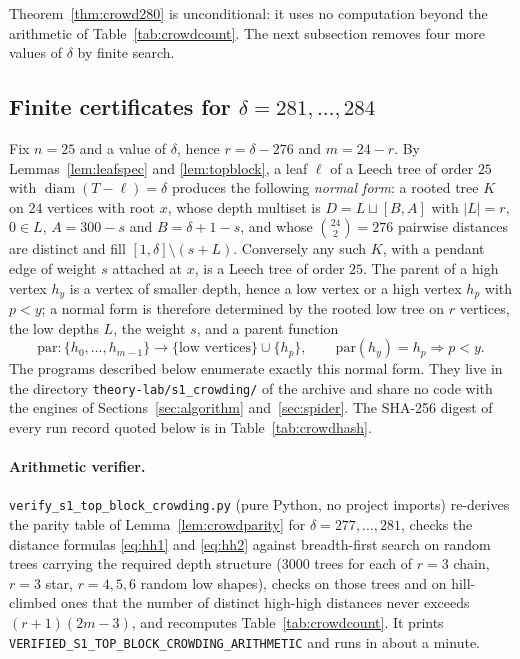 \documentclass[11pt,a4paper]{article}
\theoremstyle{plain}
\theoremstyle{remark}
\newcommand{\bin}[2]{\binom{#1}{#2}}
\newcommand{\file}[1]{\texttt{#1}}
\newcommand{\diam}{\operatorname{diam}}
\newcommand{\tok}[1]{\texttt{#1}}
\newcommand{\bk}{\discretionary{}{}{}}
\begin{document}
Theorem~\ref{thm:crowd280} is unconditional: it uses no computation beyond the
arithmetic of Table~\ref{tab:crowdcount}.  The next subsection removes four
more values of $\delta$ by finite search.

\subsection{Finite certificates for \texorpdfstring{$\delta=281,\dots,284$}{delta = 281 to 284}}
\label{sec:crowdcert}

Fix $n=25$ and a value of $\delta$, hence $r=\delta-276$ and $m=24-r$.  By
Lemmas~\ref{lem:leafspec} and \ref{lem:topblock}, a leaf $\ell$ of a Leech tree
of order $25$ with $\diam(T-\ell)=\delta$ produces the following
\emph{normal form}: a rooted tree $K$ on $24$ vertices with root $x$, whose
depth multiset is $D=L\sqcup[B,A]$ with $|L|=r$, $0\in L$, $A=300-s$ and
$B=\delta+1-s$, and whose $\bin{24}2=276$ pairwise distances are distinct and
fill $[1,\delta]\setminus(s+L)$.  Conversely any such $K$, with a pendant edge
of weight $s$ attached at $x$, is a Leech tree of order $25$.  The parent of a
high vertex $h_y$ is a vertex of smaller depth, hence a low vertex or a high
vertex $h_p$ with $p<y$; a normal form is therefore determined by the rooted
low tree on $r$ vertices, the low depths $L$, the weight $s$, and a parent
function
\[
  \mathrm{par}\colon\{h_0,\dots,h_{m-1}\}\longrightarrow
  \{\text{low vertices}\}\cup\{h_p\},\qquad
  \mathrm{par}(h_y)=h_p\Rightarrow p<y .
\]
The programs described below enumerate exactly this normal form.  They live in the
directory \file{theory-lab/s1\_crowding/} of the archive and share no code
with the engines of Sections~\ref{sec:algorithm} and~\ref{sec:spider}.  The
SHA-256 digest of every run record quoted below is in
Table~\ref{tab:crowdhash}.

\paragraph{Arithmetic verifier.}
\file{verify\_s1\_top\_block\_crowding.py} (pure Python, no project imports)
re-derives the parity table of Lemma~\ref{lem:crowdparity} for
$\delta=277,\dots,281$, checks the distance formulas \eqref{eq:hh1} and
\eqref{eq:hh2} against breadth-first search on random trees carrying the
required depth structure ($3000$ trees for each of $r=3$ chain, $r=3$ star,
$r=4,5,6$ random low shapes), checks on those trees and on hill-climbed ones
that the number of distinct high-high distances never exceeds $(r+1)(2m-3)$,
and recomputes Table~\ref{tab:crowdcount}.  It prints
\tok{VERIFIED\_\bk S1\_\bk TOP\_\bk BLOCK\_\bk CROWDING\_\bk ARITHMETIC}
and runs in about a minute.
\end{document}
